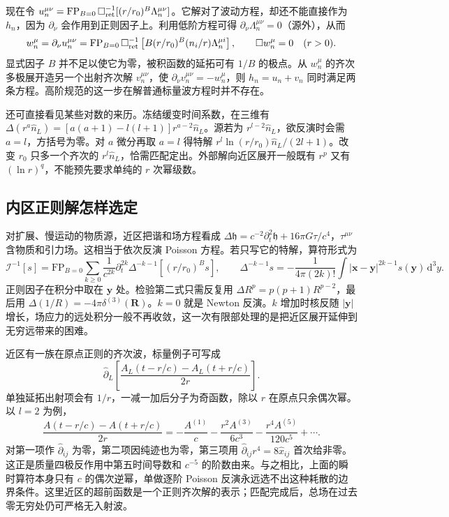 现在令 $u_n^{\mu\nu}=\mathrm{FP}_{B=0}\,\square_{\rm ret}^{-1}[(r/r_0)^B\Lambda_n^{\mu\nu}]$。它解对了波动方程，却还不能直接作为 $h_n$，因为 $\partial_\nu$ 会作用到正则因子上。利用低阶方程可得 $\partial_\nu\Lambda_n^{\mu\nu}=0$（源外），从而
\[
 w_n^\mu=\partial_\nu u_n^{\mu\nu}
 =\mathrm{FP}_{B=0}\,\square_{\rm ret}^{-1}
       \left[B(r/r_0)^B(n_i/r)\Lambda_n^{\mu i}\right],
 \qquad \square w_n^\mu=0 \quad(r>0).
\]
显式因子 $B$ 并不足以使它为零，被积函数的延拓可有 $1/B$ 的极点。从 $w_n^\mu$ 的齐次多极展开造另一个出射齐次解 $v_n^{\mu\nu}$，使 $\partial_\nu v_n^{\mu\nu}=-w_n^\mu$，则 $h_n=u_n+v_n$ 同时满足两条方程。高阶规范的这一步在解普通标量波方程时并不存在。

还可直接看见某些对数的来历。冻结缓变时间系数，在三维有 $\Delta(r^a\hat n_L)=[a(a+1)-l(l+1)]r^{a-2}\hat n_L$。源若为 $r^{l-2}\hat n_L$，欲反演时会需 $a=l$，方括号为零。对 $a$ 微分再取 $a=l$ 得特解 $r^l\ln(r/r_0)\hat n_L/(2l+1)$。改变 $r_0$ 只多一个齐次的 $r^l\hat n_L$，恰需匹配定出。外部解向近区展开一般既有 $r^p$ 又有 $(\ln r)^q$，不能预先要求单纯的 $r$ 次幂级数。

\subsection{内区正则解怎样选定}

对扩展、慢运动的物质源，近区把谐和场方程看成 $\Delta\mathfrak h=c^{-2}\partial_t^2\mathfrak h+16\pi G\tau/c^4$，$\tau^{\mu\nu}$ 含物质和引力场。这相当于依次反演 Poisson 方程。若只写它的特解，算符形式为
\[
 \mathcal I^{-1}[s]=\mathrm{FP}_{B=0}
   \sum_{k\ge0}\frac{1}{c^{2k}}\partial_t^{2k}
        \Delta^{-k-1}[(r/r_0)^B s],\qquad
 \Delta^{-k-1}s=-\frac{1}{4\pi(2k)!}\int
      |\bm x-\bm y|^{2k-1}s(\bm y)\,\mathrm d^3y .
\]
正则因子在积分中取在 $\bm y$ 处。检验第二式只需反复用 $\Delta R^p=p(p+1)R^{p-2}$，最后用 $\Delta(1/R)=-4\pi\delta^{(3)}(\bm R)$。$k=0$ 就是 Newton 反演。$k$ 增加时核反随 $|\bm y|$ 增长，场应力的远处积分一般不再收敛，这一次有限部处理的是把近区展开延伸到无穷远带来的困难。

近区有一族在原点正则的齐次波，标量例子可写成
\[
 \hat\partial_L\!\left[
   \frac{A_L(t-r/c)-A_L(t+r/c)}{2r}\right].
\]
单独延拓出射项会有 $1/r$，一减一加后分子为奇函数，除以 $r$ 在原点只余偶次幂。以 $l=2$ 为例，
\[
 \frac{A(t-r/c)-A(t+r/c)}{2r}
  =-\frac{A^{(1)}}{c}-\frac{r^2A^{(3)}}{6c^3}
                    -\frac{r^4A^{(5)}}{120c^5}+\cdots .
\]
对第一项作 $\hat\partial_{ij}$ 为零，第二项因纯迹也为零，第三项用 $\hat\partial_{ij}r^4=8\hat x_{ij}$ 首次给非零。这正是质量四极反作用中第五时间导数和 $c^{-5}$ 的阶数由来。与之相比，上面的瞬时算符本身只有 $c$ 的偶次逆幂，单做逐阶 Poisson 反演永远选不出这种耗散的边界条件。这里近区的超前函数是一个正则齐次解的表示；匹配完成后，总场在过去零无穷处仍可严格无入射波。

